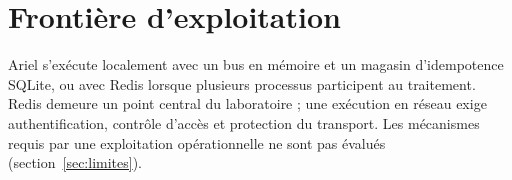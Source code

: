 \section{Frontière d'exploitation}

Ariel \logminer{} s'exécute localement avec un bus en mémoire et un magasin d'idempotence
SQLite, ou avec Redis lorsque plusieurs processus participent au traitement. Redis demeure
un point central du laboratoire ; une exécution en réseau exige authentification, contrôle
d'accès et protection du transport. Les mécanismes requis par une exploitation
opérationnelle ne sont pas évalués (section~\ref{sec:limites}).
